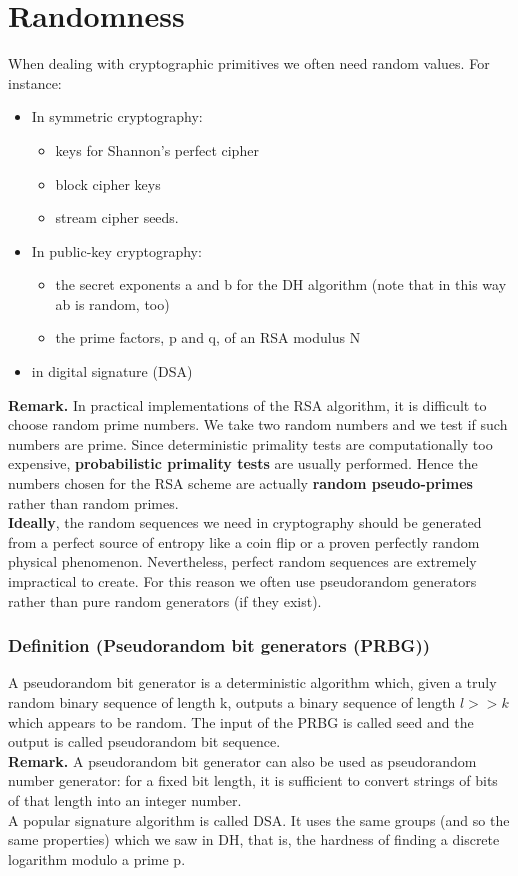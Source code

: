 \documentclass[a4paper, 10pt, titlepage]{article}
\begin{document}
\section{Randomness}
When dealing with cryptographic primitives we often need random values.
For instance: 
\begin{itemize}
\item In symmetric cryptography:
	\begin{itemize}
	\item keys for Shannon’s perfect cipher
	\item block cipher keys
	\item stream cipher seeds.
	\end{itemize}
\item In public-key cryptography:
	\begin{itemize}
	\item the secret exponents a and b for the DH algorithm (note that in this way ab is random, too)
	\item the prime factors, p and q, of an RSA modulus N
	\end{itemize}
\item in digital signature (DSA)
\end{itemize}
\textbf{Remark.} In practical implementations of the RSA algorithm, it is difficult to choose random prime numbers. We take two random numbers and we test if such numbers are prime. Since deterministic primality tests are computationally too expensive, \textbf{probabilistic primality tests} are usually performed.
Hence the numbers chosen for the RSA scheme are actually \textbf{random pseudo-primes} rather than random primes. \medskip \\
\textbf{Ideally}, the random sequences we need in cryptography should be generated from a perfect source of entropy like a coin flip or a proven perfectly random physical phenomenon. Nevertheless, perfect random sequences are extremely impractical to create.
For this reason we often use pseudorandom generators rather than pure random generators (if they exist).

\subsubsection*{Definition (Pseudorandom bit generators (PRBG))}
A pseudorandom bit generator is a deterministic algorithm which, given a truly random binary sequence of length k, outputs a binary sequence of length $l >> k$ which appears to be random. The input of the PRBG is called seed and the output is called pseudorandom bit sequence. \\
\textbf{Remark.} A pseudorandom bit generator can also be used as pseudorandom number generator: for a fixed bit length, it is sufficient to convert strings of bits of that length into an integer number. \medskip \\
A popular signature algorithm is called DSA. It uses the same groups (and so the same properties) which we saw in DH, that is, the hardness of finding a discrete logarithm modulo a prime p.
\end{document}
